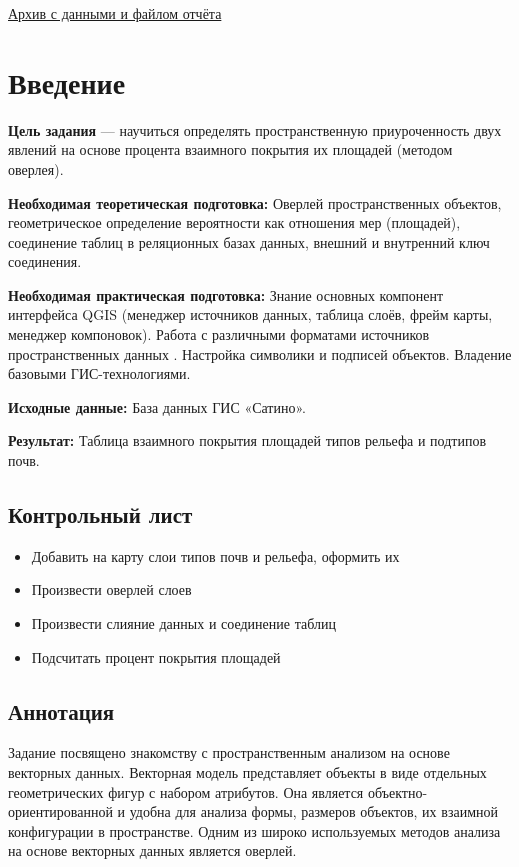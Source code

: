 \documentclass[
  12pt,
]{book}
\providecommand{\tightlist}{%
  \setlength{\itemsep}{0pt}\setlength{\parskip}{0pt}}
\begin{document}
\href{https://1drv.ms/u/s!AmtmZDq3JgxHgZwTRaz2TTFXB0zi1A?e=2zaqzG}{Архив с данными и файлом отчёта}

\hypertarget{overlay-intro}{%
\section{Введение}\label{overlay-intro}}

\textbf{Цель задания} --- научиться определять пространственную приуроченность двух явлений на основе процента взаимного покрытия их площадей (методом оверлея).

\textbf{Необходимая теоретическая подготовка:} Оверлей пространственных объектов, геометрическое определение вероятности как отношения мер (площадей), соединение таблиц в реляционных базах данных, внешний и внутренний ключ соединения.

\textbf{Необходимая практическая подготовка:} Знание основных компонент интерфейса QGIS (менеджер источников данных, таблица слоёв, фрейм карты, менеджер компоновок). Работа с различными форматами источников пространственных данных . Настройка символики и подписей объектов. Владение базовыми ГИС-технологиями.

\textbf{Исходные данные:} База данных ГИС «Сатино».

\textbf{Результат:} Таблица взаимного покрытия площадей типов рельефа и подтипов почв.

\hypertarget{overlay-control}{%
\subsection{Контрольный лист}\label{overlay-control}}

\begin{itemize}
\tightlist
\item
  Добавить на карту слои типов почв и рельефа, оформить их
\item
  Произвести оверлей слоев
\item
  Произвести слияние данных и соединение таблиц
\item
  Подсчитать процент покрытия площадей
\end{itemize}

\hypertarget{overlay-annotation}{%
\subsection{Аннотация}\label{overlay-annotation}}

Задание посвящено знакомству с пространственным анализом на основе векторных данных. Векторная модель представляет объекты в виде отдельных геометрических фигур с набором атрибутов. Она является объектно-ориентированной и удобна для анализа формы, размеров объектов, их взаимной конфигурации в пространстве. Одним из широко используемых методов анализа на основе векторных данных является оверлей.
\end{document}
